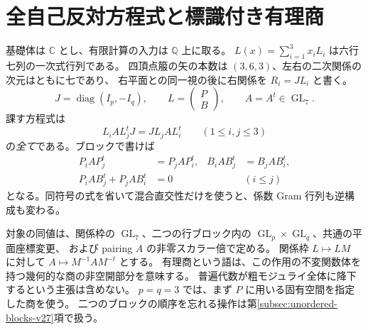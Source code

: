\section{全自己反対方程式と標識付き有理商}
\label{sec:prym-setup-v26}
基礎体は $\mathbb C$ とし、有限計算の入力は $\mathbb Q$ 上に取る。
$L(x)=\sum_{i=1}^3x_iL_i$ は六行七列の一次式行列である。
四頂点箙の矢の本数は $(3,6,3)$、左右の二次関係の次元はともに七であり、
右平面との同一視の後に右関係を $R_i=JL_i$ と書く。
\[
 J=\operatorname{diag}(I_p,-I_q),\qquad
 L=\begin{pmatrix}P\\B\end{pmatrix},\qquad A=A^t\in\operatorname{GL}_7.
\]
課す方程式は
\begin{equation}\label{eq:full-incidence-v26}
 L_iAL_j^tJ=JL_jAL_i^t\qquad(1\leq i,j\leq3)
\end{equation}
の\emph{全て}である。ブロックで書けば
\begin{align*}
 P_iAP_j^t&=P_jAP_i^t,& B_iAB_j^t&=B_jAB_i^t,\\
 P_iAB_j^t+P_jAB_i^t&=0 &&(i\leq j)
\end{align*}
となる。同符号の式を省いて混合直交性だけを使うと、係数 Gram 行列も逆構成も変わる。

対象の同値は、関係枠の $\operatorname{GL}_7$、二つの行ブロック内の
$\operatorname{GL}_p\times\operatorname{GL}_q$、共通の平面座標変更、
および pairing $A$ の非零スカラー倍で定める。
関係枠 $L\mapsto LM$ に対して $A\mapsto M^{-1}AM^{-t}$ とする。
有理商という語は、この作用の不変関数体を持つ幾何的な商の非空開部分を意味する。
普遍代数が粗モジュライ全体に降下するという主張は含めない。
$p=q=3$ では、まず $P$ に用いる固有空間を指定した商を使う。
二つのブロックの順序を忘れる操作は第\ref{subsec:unordered-blocks-v27}項で扱う。

